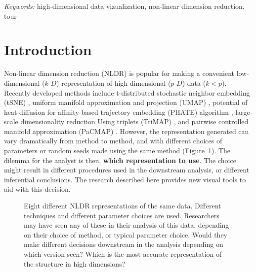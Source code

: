 \documentclass[
  12pt]{article}
\newcommand\pD{$p\text{-}D$}
\newcommand\kD{$k\text{-}D$}
\begin{document}
\noindent%
{\it Keywords:} high-dimensional data vizualization, non-linear
dimension reduction, tour
\vfill

\newpage
{} %



\section{Introduction}\label{introduction}

Non-linear dimension reduction (NLDR) is popular for making a convenient
low-dimensional (\kD{}) representation of high-dimensional (\pD{}) data
(\(k < p\)). Recently developed methods include t-distributed stochastic
neighbor embedding (tSNE) \citep{laurens2008}, uniform manifold
approximation and projection (UMAP) \citep{leland2018}, potential of
heat-diffusion for affinity-based trajectory embedding (PHATE) algorithm
\citep{moon2019}, large-scale dimensionality reduction Using triplets
(TriMAP) \citep{amid2022}, and pairwise controlled manifold
approximation (PaCMAP) \citep{yingfan2021}. However, the representation
generated can vary dramatically from method to method, and with
different choices of parameters or random seeds made using the same
method (Figure~\ref{fig-NLDR-variety}). The dilemma for the analyst is
then, \textbf{which representation to use}. The choice might result in
different procedures used in the downstream analysis, or different
inferential conclusions. The research described here provides new visual
tools to aid with this decision.

\begin{figure}


\caption{\label{fig-NLDR-variety}Eight different NLDR representations of
the same data. Different techniques and different parameter choices are
used. Researchers may have seen any of these in their analysis of this
data, depending on their choice of method, or typical parameter choice.
Would they make different decisions downstream in the analysis depending
on which version seen? Which is the most accurate representation of the
structure in high dimensions?}

\end{figure}%
\end{document}
